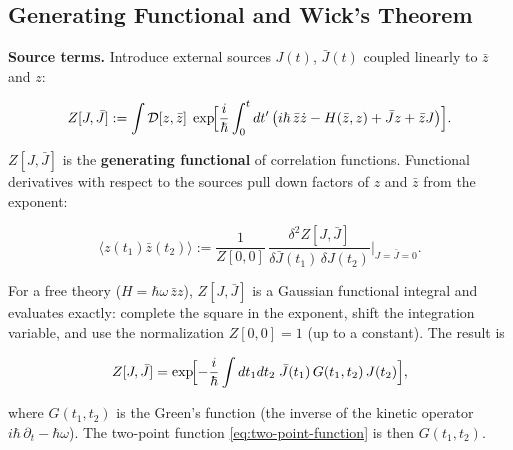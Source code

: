 \subsection{Generating Functional and Wick's Theorem}

\medskip\noindent\textbf{Source terms.} Introduce external sources $J(t)$, $\bar J(t)$ coupled linearly to $\bar z$ and $z$:
\begin{linenomath}
\begin{equation}
Z[J,\bar J] := \int\mathcal{D}[z,\bar z]\;
\exp\!\Bigl[\frac{i}{\hbar}\int_{0}^{t}dt'\,
\bigl(i\hbar\,\bar z\dot z - H(\bar z,z) + \bar J z + \bar z J\bigr)\Bigr].
\label{eq:generating-functional}
\end{equation}
\end{linenomath}
$Z[J,\bar J]$ is the \textbf{generating functional} of correlation functions. Functional derivatives with respect to the sources pull down factors of $z$ and $\bar z$ from the exponent:
\begin{linenomath}
\begin{equation}
\langle z(t_{1})\bar z(t_{2})\rangle
:= \frac{1}{Z[0,0]}\,
\frac{\delta^{2}Z[J,\bar J]}{\delta\bar J(t_{1})\,\delta J(t_{2})}\Big|_{J=\bar J=0}.
\label{eq:two-point-function}
\end{equation}
\end{linenomath}
For a free theory ($H = \hbar\omega\,\bar z z$), $Z[J,\bar J]$ is a Gaussian functional integral and evaluates exactly: complete the square in the exponent, shift the integration variable, and use the normalization $Z[0,0] = 1$ (up to a constant). The result is
\begin{linenomath}
\begin{equation}
Z[J,\bar J] = \exp\!\Bigl[-\frac{i}{\hbar}\int dt_{1}dt_{2}\;
\bar J(t_{1})\,G(t_{1},t_{2})\,J(t_{2})\Bigr],
\label{eq:free-generating-functional}
\end{equation}
\end{linenomath}
where $G(t_{1},t_{2})$ is the Green's function (the inverse of the kinetic operator $i\hbar\,\partial_{t} - \hbar\omega$). The two-point function \eqref{eq:two-point-function} is then $G(t_{1},t_{2})$.


